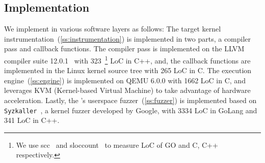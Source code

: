 \subsection{Implementation}
\label{ss:impl}

We implement \sys in various software layers as follows:
%
The target kernel instrumentation~(\autoref{ss:instrumentation}) is
implemented in two parts, a compiler pass and callback functions. The
compiler pass is implemented on the LLVM compiler suite
12.0.1~\cite{llvm} with 323~\footnote{We use scc~\cite{scc} and
  sloccount~\cite{sloccount} to measure LoC of GO and C, C++
  respectively.} LoC in C++, and, the callback functions are
implemented in the Linux kernel source tree with 265 LoC in C.
%
The execution engine~(\autoref{ss:engine}) is implemented on QEMU
6.0.0 with 1662 LoC in C, and leverages KVM (Kernel-based Virtual
Machine) to take advantage of hardware acceleration.
%
%
Lastly, the \sys's userspace fuzzer~(\autoref{ss:fuzzer}) is
implemented based on \texttt{Syzkaller}~\cite{syzkaller}, a kernel
fuzzer developed by Google, with 3334 LoC in GoLang and 341 LoC in C++.











